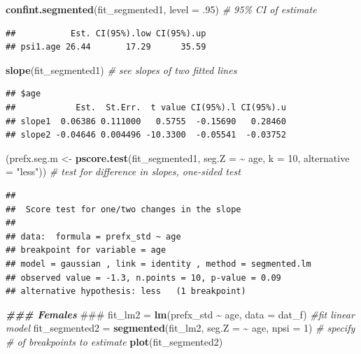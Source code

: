 \documentclass[
]{article}
\newenvironment{Shaded}{\begin{snugshade}}{\end{snugshade}}
\newcommand{\AlertTok}[1]{\textcolor[rgb]{0.94,0.16,0.16}{#1}}
\newcommand{\AttributeTok}[1]{\textcolor[rgb]{0.13,0.29,0.53}{#1}}
\newcommand{\CommentTok}[1]{\textcolor[rgb]{0.56,0.35,0.01}{\textit{#1}}}
\newcommand{\DecValTok}[1]{\textcolor[rgb]{0.00,0.00,0.81}{#1}}
\newcommand{\DocumentationTok}[1]{\textcolor[rgb]{0.56,0.35,0.01}{\textbf{\textit{#1}}}}
\newcommand{\FunctionTok}[1]{\textcolor[rgb]{0.13,0.29,0.53}{\textbf{#1}}}
\newcommand{\NormalTok}[1]{#1}
\newcommand{\OtherTok}[1]{\textcolor[rgb]{0.56,0.35,0.01}{#1}}
\newcommand{\SpecialCharTok}[1]{\textcolor[rgb]{0.81,0.36,0.00}{\textbf{#1}}}
\newcommand{\StringTok}[1]{\textcolor[rgb]{0.31,0.60,0.02}{#1}}
\begin{document}
\begin{Shaded}
\begin{Highlighting}[]
\FunctionTok{confint.segmented}\NormalTok{(fit\_segmented1, }\AttributeTok{level =}\NormalTok{ .}\DecValTok{95}\NormalTok{) }\CommentTok{\# 95\% CI of estimate}
\end{Highlighting}
\end{Shaded}

\begin{verbatim}
##           Est. CI(95%).low CI(95%).up
## psi1.age 26.44       17.29      35.59
\end{verbatim}

\begin{Shaded}
\begin{Highlighting}[]
\FunctionTok{slope}\NormalTok{(fit\_segmented1) }\CommentTok{\# see slopes of two fitted lines}
\end{Highlighting}
\end{Shaded}

\begin{verbatim}
## $age
##            Est.  St.Err.  t value CI(95%).l CI(95%).u
## slope1  0.06386 0.111000   0.5755  -0.15690   0.28460
## slope2 -0.04646 0.004496 -10.3300  -0.05541  -0.03752
\end{verbatim}

\begin{Shaded}
\begin{Highlighting}[]
\NormalTok{(prefx.seg.m }\OtherTok{\textless{}{-}} \FunctionTok{pscore.test}\NormalTok{(fit\_segmented1, }\AttributeTok{seg.Z =} \SpecialCharTok{\textasciitilde{}}\NormalTok{ age, }\AttributeTok{k =} \DecValTok{10}\NormalTok{, }\AttributeTok{alternative =} \StringTok{"less"}\NormalTok{)) }\CommentTok{\# test for difference in slopes, one{-}sided test}
\end{Highlighting}
\end{Shaded}

\begin{verbatim}
## 
##  Score test for one/two changes in the slope
## 
## data:  formula = prefx_std ~ age 
## breakpoint for variable = age 
## model = gaussian , link = identity , method = segmented.lm
## observed value = -1.3, n.points = 10, p-value = 0.09
## alternative hypothesis: less   (1 breakpoint)
\end{verbatim}

\begin{Shaded}
\begin{Highlighting}[]
\DocumentationTok{\#\#\# Females }\AlertTok{\#\#\#}
\NormalTok{fit\_lm2 }\OtherTok{=} \FunctionTok{lm}\NormalTok{(prefx\_std }\SpecialCharTok{\textasciitilde{}}\NormalTok{ age, }\AttributeTok{data =}\NormalTok{ dat\_f) }\CommentTok{\#fit linear model}
\NormalTok{fit\_segmented2 }\OtherTok{=} \FunctionTok{segmented}\NormalTok{(fit\_lm2, }\AttributeTok{seg.Z =} \SpecialCharTok{\textasciitilde{}}\NormalTok{ age, }\AttributeTok{npsi =} \DecValTok{1}\NormalTok{)   }\CommentTok{\# specify \# of breakpoints to estimate}
\FunctionTok{plot}\NormalTok{(fit\_segmented2)}
\end{Highlighting}
\end{Shaded}
\end{document}
